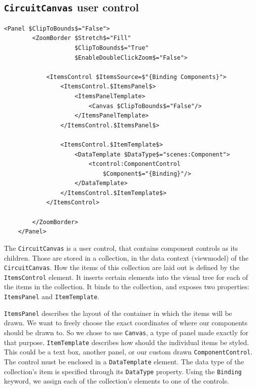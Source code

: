 
\subsection{\texttt{CircuitCanvas} user control} \label{subsec:f_canvas}

\begin{lstlisting}[language={xaml}, caption={\texttt{CircuitCanvas} view layout}]
    <Panel $ClipToBounds$="False">
        <ZoomBorder $Stretch$="Fill" 
                    $ClipToBounds$="True" 
                    $EnableDoubleClickZoom$="False">

            <ItemsControl $ItemsSource=$"{Binding Components}">
                <ItemsControl.$ItemsPanel$>
                    <ItemsPanelTemplate>
                        <Canvas $ClipToBounds$="False"/>
                    </ItemsPanelTemplate>
                </ItemsControl.$ItemsPanel$>
    
                <ItemsControl.$ItemTemplate$>
                    <DataTemplate $DataType$="scenes:Component">
                        <tcontrol:ComponentControl 
                            $Component$="{Binding}"/>
                    </DataTemplate>
                </ItemsControl.$ItemTemplate$>
            </ItemsControl>
            
        </ZoomBorder>
    </Panel>
\end{lstlisting}

The \texttt{CircuitCanvas} is a user control, that contains component controls as its children. Those are stored in a collection, in the data context (viewmodel) of the \texttt{CircuitCanvas}. How the items of this collection are laid out is defined by the \texttt{ItemsControl} element. It inserts certain elements into the visual tree for each of the items in the collection. It binds to the collection, and exposes two properties: \texttt{ItemsPanel} and \texttt{ItemTemplate}.

\texttt{ItemsPanel} describes the layout of the container in which the items will be drawn. We want to freely choose the exact coordinates of where our components should be drawn to. So we chose to use \texttt{Canvas}, a type of panel made exactly for that purpose. \texttt{ItemTemplate} describes how should the individual items be styled. This could be a text box, another panel, or our custom drawn \texttt{ComponentControl}. The control must be enclosed in a \texttt{DataTemplate} element. The data type of the collection's item is specified through its \texttt{DataType} property. Using the \texttt{Binding} keyword, we assign each of the collection's elements to one of the controls.

